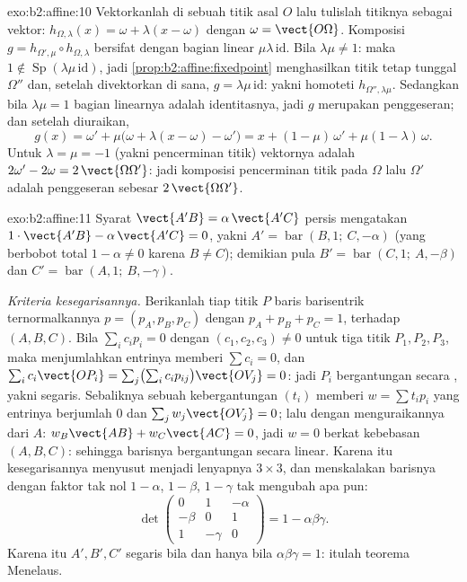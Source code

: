 \begin{solution}{exo:b2:affine:10}
Vektorkanlah di sebuah titik asal $O$ lalu tulislah titiknya sebagai vektor:
$h_{\Omega, \lambda}(x) = \omega + \lambda(x - \omega)$ dengan
$\omega = \vect{O\Omega}$. Komposisi $g = h_{\Omega',
\mu} \circ h_{\Omega, \lambda}$ bersifat  dengan bagian linear
$\mu\lambda\,\mathrm{id}$. Bila $\lambda\mu \neq 1$: maka $1 \notin
\operatorname{Sp}(\lambda\mu\,\mathrm{id})$, jadi
\cref{prop:b2:affine:fixedpoint} menghasilkan titik tetap tunggal
$\Omega''$ dan, setelah divektorkan di sana, $g =
\lambda\mu\,\mathrm{id}$: yakni homoteti $h_{\Omega'',
\lambda\mu}$. Sedangkan bila $\lambda\mu = 1$ bagian linearnya adalah
identitasnya, jadi $g$ merupakan penggeseran; dan setelah diuraikan,
\[
g(x) = \omega' + \mu\bigl(\omega + \lambda(x - \omega) -
\omega'\bigr) = x + (1 - \mu)\,\omega' + \mu(1 -
\lambda)\,\omega .
\]
Untuk $\lambda = \mu = -1$ (yakni pencerminan titik) vektornya adalah
$2\omega' - 2\omega = 2\,\vect{\Omega\Omega'}$: jadi
komposisi pencerminan titik pada $\Omega$ lalu
$\Omega'$ adalah penggeseran sebesar $2\,\vect{\Omega\Omega'}$.
\end{solution}

\begin{solution}{exo:b2:affine:11}
Syarat $\vect{A'B} = \alpha\,\vect{A'C}$ persis mengatakan $1\cdot
\vect{A'B} - \alpha\,\vect{A'C} = 0$, yakni $A' =
\operatorname{bar}(B, 1;\ C, -\alpha)$ (yang berbobot total $1 -
\alpha \neq 0$ karena $B \neq C$); demikian pula $B' =
\operatorname{bar}(C, 1;\ A, -\beta)$ dan $C' =
\operatorname{bar}(A, 1;\ B, -\gamma)$.

\emph{Kriteria kesegarisannya.} Berikanlah tiap titik $P$ baris
barisentrik ternormalkannya $p = (p_A, p_B, p_C)$ dengan $p_A + p_B +
p_C = 1$, terhadap $(A, B, C)$. Bila $\sum_i c_i p_i = 0$
dengan $(c_1, c_2, c_3) \neq 0$ untuk tiga titik $P_1, P_2,
P_3$, maka menjumlahkan entrinya memberi $\sum c_i = 0$, dan
$\sum_i c_i \vect{OP_i} = \sum_j \bigl(\sum_i
c_ip_{ij}\bigr)\vect{OV_j} = 0$: jadi $P_i$ bergantungan secara
, yakni segaris. Sebaliknya sebuah kebergantungan 
$(t_i)$ memberi $w = \sum t_ip_i$ yang entrinya berjumlah $0$
dan $\sum_j w_j\vect{OV_j} = 0$; lalu dengan menguraikannya dari $A$: $w_B
\vect{AB} + w_C\vect{AC} = 0$, jadi $w = 0$ berkat kebebasan
 $(A, B, C)$: sehingga barisnya bergantungan secara linear.
Karena itu kesegarisannya menyusut menjadi lenyapnya  $3 \times 3$,
dan menskalakan barisnya dengan faktor tak nol $1 - \alpha$, $1 -
\beta$, $1 - \gamma$ tak mengubah apa pun:
\[
\det\begin{pmatrix} 0 & 1 & -\alpha\\ -\beta & 0 & 1\\ 1 &
-\gamma & 0\end{pmatrix}
= 1 - \alpha\beta\gamma .
\]
Karena itu $A', B', C'$ segaris bila dan hanya bila $\alpha\beta\gamma = 1$:
itulah teorema Menelaus.
\end{solution}

